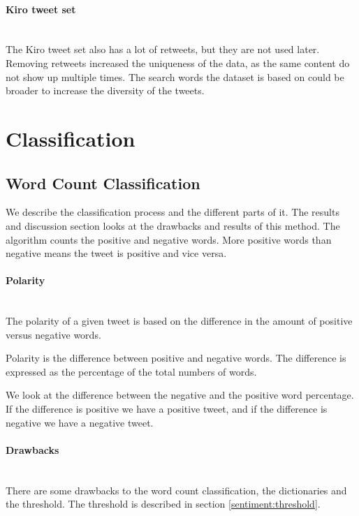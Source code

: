 \paragraph{Kiro tweet set}
\hspace{0pt}\\
The Kiro tweet set also has a lot of retweets, but they are not used later.
Removing retweets increased the uniqueness of the data, as the same content
do not show up multiple times. The search words the dataset is based on
could be broader to increase the diversity of the tweets.
%

\section{Classification}\label{sentiment:classification}
\subsection{Word Count Classification}\label{sentiment:word_count_classification}
We describe the classification process and the different parts of it. The
results and discussion section looks at the drawbacks and results of this method.
The algorithm counts the positive and negative words. More positive words than
negative means the tweet is positive and vice versa. 

\paragraph{Polarity} 
\hspace{0pt}\\ 
The polarity of a given tweet is based on the difference in the amount of
positive versus negative words. 

Polarity is the difference between positive and negative words. The difference is
expressed as the percentage of the total numbers of words.  

We look at the difference between the negative and the positive word
percentage. If the difference is positive we have a positive tweet, and if the
difference is negative we have a negative tweet.

\paragraph{Drawbacks}
\hspace{0pt}\\
There are some drawbacks to the word count classification, the dictionaries
and the threshold. The threshold is described in section
\ref{sentiment:threshold}. 

